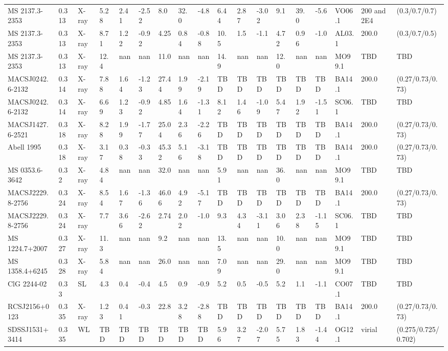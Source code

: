 \documentclass{article}
\begin{document}
\begin{center}
\begin{landscape}
\begin{longtable}{llllllllllllllllll}
MS 2137.3-2353 & 0.313 & X-ray & 5.28 & 2.41 & -2.52 & 8.0 & 32.0 & -4.8 & 6.44 & 2.87 & -3.02 & 9.1 & 39.0 & -5.6 & VO06.1 & 200 and 2E4 & (0.3/0.7/0.7) \\
MS 2137.3-2353 & 0.313 & X-ray & 8.71 & 1.22 & -0.92 & 4.25 & 0.84 & -0.88 & 10.5 & 1.5 & -1.1 & 4.72 & 0.96 & -1.0 & AL03.1 & 200.0 & (0.3/0.7/0.5) \\
MS 2137.3-2353 & 0.313 & X-ray & 12.4 & nan & nan & 11.0 & nan & nan & 14.9 & nan & nan & 12.0 & nan & nan & MO99.1 & TBD & TBD \\
MACSJ0242.6-2132 & 0.314 & X-ray & 7.88 & 1.64 & -1.23 & 27.44 & 1.99 & -2.19 & TBD & TBD & TBD & TBD & TBD & TBD & BA14.1 & 200.0 & (0.27/0.73/0.73) \\
MACSJ0242.6-2132 & 0.314 & X-ray & 6.69 & 1.23 & -0.92 & 4.85 & 1.64 & -1.31 & 8.12 & 1.46 & -1.09 & 5.47 & 1.92 & -1.51 & SC06.1 & TBD & TBD \\
MACSJ1427.6-2521 & 0.318 & X-ray & 8.28 & 1.99 & -1.77 & 25.04 & 2.36 & -2.26 & TBD & TBD & TBD & TBD & TBD & TBD & BA14.1 & 200.0 & (0.27/0.73/0.73) \\
Abell 1995 & 0.318 & X-ray & 3.17 & 0.38 & -0.33 & 45.32 & 5.16 & -3.18 & TBD & TBD & TBD & TBD & TBD & TBD & BA14.1 & 200.0 & (0.27/0.73/0.73) \\
MS 0353.6-3642 & 0.32 & X-ray & 4.84 & nan & nan & 32.0 & nan & nan & 5.91 & nan & nan & 36.0 & nan & nan & MO99.1 & TBD & TBD \\
MACSJ2229.8-2756 & 0.324 & X-ray & 8.54 & 1.67 & -1.36 & 46.06 & 4.92 & -5.17 & TBD & TBD & TBD & TBD & TBD & TBD & BA14.1 & 200.0 & (0.27/0.73/0.73) \\
MACSJ2229.8-2756 & 0.324 & X-ray & 7.7 & 3.66 & -2.62 & 2.74 & 2.02 & -1.0 & 9.3 & 4.34 & -3.11 & 3.06 & 2.38 & -1.15 & SC06.1 & TBD & TBD \\
MS 1224.7+2007 & 0.327 & X-ray & 11.3 & nan & nan & 9.2 & nan & nan & 13.5 & nan & nan & 10.0 & nan & nan & MO99.1 & TBD & TBD \\
MS 1358.4+6245 & 0.328 & X-ray & 5.84 & nan & nan & 26.0 & nan & nan & 7.09 & nan & nan & 29.0 & nan & nan & MO99.1 & TBD & TBD \\
ClG 2244-02 & 0.33 & SL & 4.3 & 0.4 & -0.4 & 4.5 & 0.9 & -0.9 & 5.2 & 0.5 & -0.5 & 5.2 & 1.1 & -1.1 & CO07.1 & TBD & TBD \\
RCSJ2156+0123 & 0.335 & X-ray & 1.23 & 0.41 & -0.3 & 22.8 & 3.28 & -2.88 & TBD & TBD & TBD & TBD & TBD & TBD & BA14.1 & 200.0 & (0.27/0.73/0.73) \\
SDSSJ1531+3414 & 0.335 & WL & TBD & TBD & TBD & TBD & TBD & TBD & 5.96 & 3.27 & -2.07 & 5.75 & 1.83 & -1.44 & OG12.1 & virial & (0.275/0.725/0.702) \\

\end{longtable}
\end{landscape}
\end{center}
\end{document}
